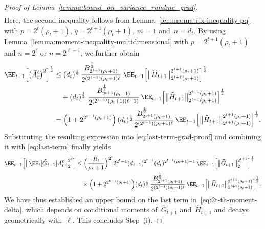 \documentclass[11pt]{article}
\let\hat\widehat
\begin{document}
\begin{proof}[Proof of Lemma~\ref{lemma:bound_on_variance_rumlmc_grad}]
\begin{align*}
\end{align*}
Here, the second inequality follows from Lemma~\ref{lemma:matrix-inequality-pq} with $p=2^t(\rho_t+1)$, $q=2^{t+1}(\rho_t+1)$, $m=1$ and~$n=d_t$.
By using Lemma~\ref{lemma:moment-inequality-multidimensional} with $p=2^{t+1}(\rho_t+1)$ and $n=2^\ell$ or $n=2^{\ell-1}$, we further obtain
\begin{align*}
    \EE_{t-1}\Big[ \big(\bar{A}_t^\ell\big)^2\Big]^\frac{1}{2} & \leq (d_t)^\frac{1}{2}\,\frac{B_{2^{t+1}(\rho_t+1)}^\frac{1}{2}}{2^{(2^{t-1})(\rho_t+1)\ell}} \;\EE_{t-1}\Big[\big\|\hat{H}_{t+1}\big\|_{2^{t+1}(\rho_t+1)}^{2^{t+1}(\rho_t+1)}\Big]^\frac{1}{2} \\
    &\quad + 
    (d_t)^\frac{1}{2} \; \frac{B_{2^{t+1}(\rho_t+1)}^\frac{1}{2}}{2^{(2^{t-1)}(\rho_t+1)(\ell-1)}}\, \EE_{t-1}\Big[\big\|\hat{H}_{t+1}\big\|_{2^{t+1}(\rho_t+1)}^{2^{t+1}(\rho_t+1)}\Big]^\frac{1}{2}\\
    & = \Big(1 + 2^{2^{t-1}(\rho_t+1)}\Big) \, (d_t)^\frac{1}{2} \frac{B_{2^{t+1}(\rho_t+1)}^\frac{1}{2}}{2^{(2^{t-1})(\rho_t+1)\ell}}\, \EE_{t-1}\Big[\big\|\hat{H}_{t+1}\big\|_{2^{t+1}(\rho_t+1)}^{2^{t+1}(\rho_t+1)}\Big]^\frac{1}{2}  .
\end{align*}
Substituting the resulting expression into \eqref{eq:last-term-grad-proof} and combining it with \eqref{eq:last-term} finally yields
\begin{equation*}
    \begin{aligned}
    \EE_{t-1}\Big[\big\|\EE_t[\hat{G}_{t+1}] A^\ell_t\big\|_{2}^{2^t}\Big] & \leq \Big(\frac{R_t}{\rho_t+1}\Big)^{2^t} 2^{2^t-1} (d_{t-1})^{2^{t-1}}(d_t)^{2^{t-1}(\rho_t+1)-1} \, \EE_{t-1}\Big[\big\| \hat{G}_{t+1} \big\|_{2}^{2^{t+1}}\Big]^\frac{1}{2} \\
    &\quad \times \Big(1 + 2^{2^{t-1}(\rho_t+1)}\Big) (d_t)^\frac{1}{2}\, \frac{B_{2^{t+1}(\rho_t+1)}^\frac{1}{2}}{2^{(2^{t-1})(\rho_t+1)\ell}} \, \EE_{t-1}\Big[\big\|\hat{H}_{t+1}\big\|_{2^{t+1}(\rho_t+1)}^{2^{t+1}(\rho_t+1)}\Big]^\frac{1}{2} .
\end{aligned}
\end{equation*}
We have thus established an upper bound on the last term in~\eqref{eq:2t-th-moment-delta}, which depends on conditional moments of~$\hat G_{t+1}$ and~$\hat H_{t+1}$ and decays geometrically with~$\ell$. This concludes Step~(i).



\end{proof}
\end{document}
